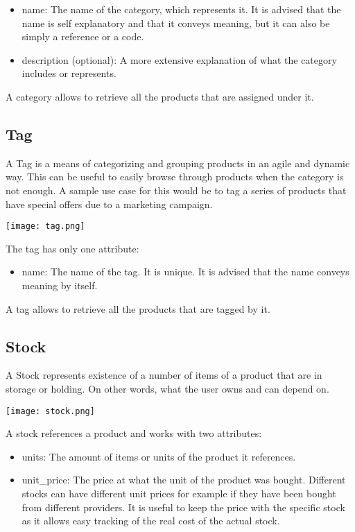 \begin{itemize}
\item name: The name of the category, which represents it. It is advised that the name is self explanatory and that it conveys meaning, but it can also be simply a reference or a code.
\item description (optional): A more extensive explanation of what the category includes or represents.
\end{itemize}

A category allows to retrieve all the products that are assigned under it.

\subsection{Tag}
A Tag is a means of categorizing and grouping products in an agile and dynamic way. This can be useful to easily browse through products when the category is not enough. A sample use case for this would be to tag a series of products that have special offers due to a marketing campaign.
\begin{center}
\texttt{[image: tag.png]}
\end{center}
The tag has only one attribute:

\begin{itemize}
\item name: The name of the tag. It is unique. It is advised that the name conveys meaning by itself.
\end{itemize}

A tag allows to retrieve all the products that are tagged by it.

\subsection{Stock}
A Stock represents existence of a number of items of a product that are in storage or holding. On other words, what the user owns and can depend on. 
\begin{center}
\texttt{[image: stock.png]}
\end{center}
A stock references a product and works with two attributes:

\begin{itemize}
\item units: The amount of items or units of the product it references.
\item unit\_price: The price at what the unit of the product was bought. Different stocks can have different unit prices for example if they have been bought from different providers. It is useful to keep the price with the specific stock as it allows easy tracking of the real cost of the actual stock.
\end{itemize}

